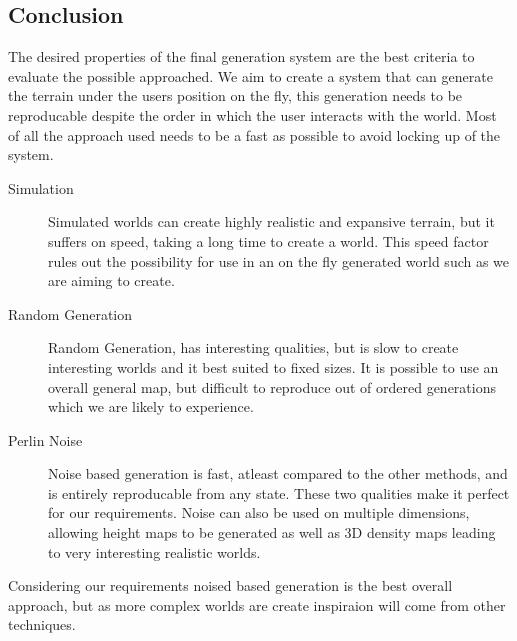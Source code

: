 \subsection{Conclusion}
The desired properties of the final generation system are the best criteria to
evaluate the possible approached. We aim to create a system that can generate
the terrain under the users position on the fly, this generation needs to be
reproducable despite the order in which the user interacts with the world. Most
of all the approach used needs to be a fast as possible to avoid locking up of
the system.\\

\begin{description}
\item[Simulation]
Simulated worlds can create highly realistic
and expansive terrain, but it suffers on speed, taking a long time to create a 
world. This speed factor rules out the possibility for use in an on the fly 
generated world such as we are aiming to create. 

\item[Random Generation] Random Generation, has 
interesting qualities, but is slow to create interesting worlds and it best
suited to fixed sizes. It is possible to use an overall general map, but 
difficult to reproduce out of ordered generations which we are likely to
experience. 

\item[Perlin Noise] Noise based generation is fast, atleast compared to the other
methods, and is entirely reproducable from any state. These two qualities make it
perfect for our requirements. Noise can also be used on multiple dimensions, 
allowing height maps to be generated as well as 3D density maps leading to very
interesting realistic worlds.
\end{description}

Considering our requirements noised based generation is the best overall 
approach,
but as more complex worlds are create inspiraion will come from other 
techniques.\\
